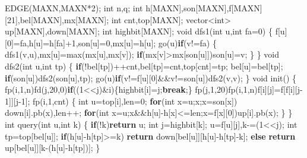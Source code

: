 \documentclass[
]{article}
\newenvironment{Shaded}{}{}
\newcommand{\ControlFlowTok}[1]{\textcolor[rgb]{0.00,0.44,0.13}{\textbf{#1}}}
\newcommand{\DataTypeTok}[1]{\textcolor[rgb]{0.56,0.13,0.00}{#1}}
\newcommand{\DecValTok}[1]{\textcolor[rgb]{0.25,0.63,0.44}{#1}}
\newcommand{\NormalTok}[1]{#1}
\begin{document}
\begin{Shaded}
\begin{Highlighting}[]
\NormalTok{EDGE(MAXN,MAXN*}\DecValTok{2}\NormalTok{);}
\DataTypeTok{int}\NormalTok{ n,q;}
\DataTypeTok{int}\NormalTok{ h[MAXN],son[MAXN],f[MAXN][}\DecValTok{21}\NormalTok{],bel[MAXN],mx[MAXN];}
\DataTypeTok{int}\NormalTok{ cnt,top[MAXN];}
\NormalTok{vector\textless{}}\DataTypeTok{int}\NormalTok{\textgreater{} up[MAXN],down[MAXN];}
\DataTypeTok{int}\NormalTok{ highbit[MAXN];}
\DataTypeTok{void}\NormalTok{ dfs1(}\DataTypeTok{int}\NormalTok{ u,}\DataTypeTok{int}\NormalTok{ fa=}\DecValTok{0}\NormalTok{)}
\NormalTok{\{}
\NormalTok{    f[u][}\DecValTok{0}\NormalTok{]=fa,h[u]=h[fa]+}\DecValTok{1}\NormalTok{,son[u]=}\DecValTok{0}\NormalTok{,mx[u]=h[u];}
\NormalTok{    go(u)}\ControlFlowTok{if}\NormalTok{(v!=fa)}
\NormalTok{    \{}
\NormalTok{        dfs1(v,u),mx[u]=max(mx[u],mx[v]);}
        \ControlFlowTok{if}\NormalTok{(mx[v]\textgreater{}mx[son[u]])son[u]=v;}
\NormalTok{    \}}
\NormalTok{\}}
\DataTypeTok{void}\NormalTok{ dfs2(}\DataTypeTok{int}\NormalTok{ u,}\DataTypeTok{int}\NormalTok{ tp)}
\NormalTok{\{}
    \ControlFlowTok{if}\NormalTok{(!bel[tp])++cnt,bel[tp]=cnt,top[cnt]=tp;}
\NormalTok{    bel[u]=bel[tp];}
    \ControlFlowTok{if}\NormalTok{(son[u])dfs2(son[u],tp);}
\NormalTok{    go(u)}\ControlFlowTok{if}\NormalTok{(v!=f[u][}\DecValTok{0}\NormalTok{]\&\&v!=son[u])dfs2(v,v);}
\NormalTok{\}}
\DataTypeTok{void}\NormalTok{ init()}
\NormalTok{\{}
\NormalTok{    fp(i,}\DecValTok{1}\NormalTok{,n)fd(j,}\DecValTok{20}\NormalTok{,}\DecValTok{0}\NormalTok{)}\ControlFlowTok{if}\NormalTok{((}\DecValTok{1}\NormalTok{\textless{}\textless{}j)\&i)\{highbit[i]=j;}\ControlFlowTok{break}\NormalTok{;\}}
\NormalTok{    fp(j,}\DecValTok{1}\NormalTok{,}\DecValTok{20}\NormalTok{)fp(i,}\DecValTok{1}\NormalTok{,n)f[i][j]=f[f[i][j{-}}\DecValTok{1}\NormalTok{]][j{-}}\DecValTok{1}\NormalTok{];}
\NormalTok{    fp(i,}\DecValTok{1}\NormalTok{,cnt)}
\NormalTok{    \{}
        \DataTypeTok{int}\NormalTok{ u=top[i],len=}\DecValTok{0}\NormalTok{;}
        \ControlFlowTok{for}\NormalTok{(}\DataTypeTok{int}\NormalTok{ x=u;x;x=son[x]) down[i].pb(x),len++;}
        \ControlFlowTok{for}\NormalTok{(}\DataTypeTok{int}\NormalTok{ x=u;x\&\&h[u]{-}h[x]\textless{}=len;x=f[x][}\DecValTok{0}\NormalTok{])up[i].pb(x);}
\NormalTok{    \}}
\NormalTok{\}}
\DataTypeTok{int}\NormalTok{ query(}\DataTypeTok{int}\NormalTok{ u,}\DataTypeTok{int}\NormalTok{ k)}
\NormalTok{\{}
    \ControlFlowTok{if}\NormalTok{(!k)}\ControlFlowTok{return}\NormalTok{ u;}
    \DataTypeTok{int}\NormalTok{ j=highbit[k];}
\NormalTok{    u=f[u][j],k{-}=(}\DecValTok{1}\NormalTok{\textless{}\textless{}j);}
    \DataTypeTok{int}\NormalTok{ tp=top[bel[u]];}
    \ControlFlowTok{if}\NormalTok{(h[u]{-}h[tp]\textgreater{}=k) }\ControlFlowTok{return}\NormalTok{ down[bel[u]][h[u]{-}h[tp]{-}k];}
    \ControlFlowTok{else} \ControlFlowTok{return}\NormalTok{ up[bel[u]][k{-}(h[u]{-}h[tp])];}
\NormalTok{\}}
\end{Highlighting}
\end{Shaded}
\end{document}
